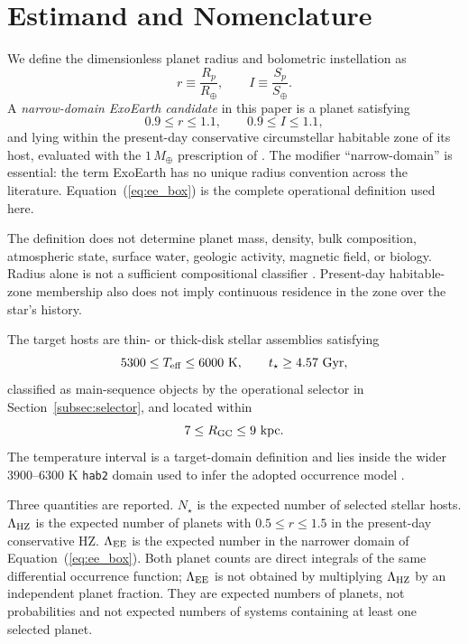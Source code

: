 \documentclass[twocolumn]{aastex631}
\newcommand{\Rearth}{R_{\oplus}}
\newcommand{\Mearth}{M_{\oplus}}
\newcommand{\Searth}{S_{\oplus}}
\newcommand{\Teff}{T_{\rm eff}}
\newcommand{\Rgc}{R_{\rm GC}}
\newcommand{\LamEE}{\Lambda_{\rm EE}}
\newcommand{\LamHZ}{\Lambda_{\rm HZ}}
\begin{document}
\section{Estimand and Nomenclature}\label{sec:estimand}

We define the dimensionless planet radius and bolometric instellation as
\begin{equation}
 r\equiv\frac{R_p}{\Rearth},
 \qquad
 I\equiv\frac{S_p}{\Searth}.
 \label{eq:variables}
\end{equation}
A \emph{narrow-domain ExoEarth candidate} in this paper is a planet satisfying
\begin{equation}
 0.9\leq r\leq1.1,
 \qquad
 0.9\leq I\leq1.1,
 \label{eq:ee_box}
\end{equation}
and lying within the present-day conservative circumstellar habitable zone of its host, evaluated with the $1\,\Mearth$ prescription of \citet{Kopparapu2013,Kopparapu2014}. The modifier ``narrow-domain'' is essential: the term ExoEarth has no unique radius convention across the literature. Equation~(\ref{eq:ee_box}) is the complete operational definition used here.

The definition does not determine planet mass, density, bulk composition, atmospheric state, surface water, geologic activity, magnetic field, or biology. Radius alone is not a sufficient compositional classifier \citep{Rogers2015}. Present-day habitable-zone membership also does not imply continuous residence in the zone over the star's history.

The target hosts are thin- or thick-disk stellar assemblies satisfying
\begin{equation}
 5300\leq\Teff\leq6000\ {\rm K},
 \qquad
 t_\star\geq4.57\ {\rm Gyr},
 \label{eq:host_window}
\end{equation}
classified as main-sequence objects by the operational selector in Section~\ref{subsec:selector}, and located within
\begin{equation}
 7\leq\Rgc\leq9\ {\rm kpc}.
 \label{eq:annulus}
\end{equation}
The temperature interval is a target-domain definition and lies inside the wider 3900--6300 K \texttt{hab2} domain used to infer the adopted occurrence model \citep{Bryson2021}.

Three quantities are reported. $N_\star$ is the expected number of selected stellar hosts. $\LamHZ$ is the expected number of planets with $0.5\leq r\leq1.5$ in the present-day conservative HZ. $\LamEE$ is the expected number in the narrower domain of Equation~(\ref{eq:ee_box}). Both planet counts are direct integrals of the same differential occurrence function; $\LamEE$ is not obtained by multiplying $\LamHZ$ by an independent planet fraction. They are expected numbers of planets, not probabilities and not expected numbers of systems containing at least one selected planet.
\end{document}
